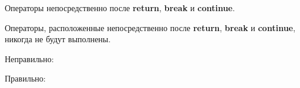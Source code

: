 \begin{typerror}
	Операторы непосредственно после \textbf{return}, \textbf{break} и \textbf{continue}.

	Операторы, расположенные непосредственно после \textbf{return}, \textbf{break} и \textbf{continue}, никогда не будут выполнены.

	Неправильно:

	Правильно:
	
\end{typerror}
